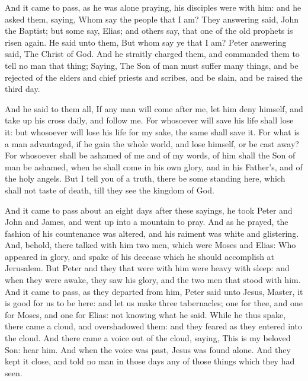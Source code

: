  And it came to pass, as he was alone praying, his
disciples were with him: and he asked them, saying, Whom say the people
that I am?  They answering said, John the Baptist; but some
say, Elias; and others say, that one of the old prophets is risen again.
 He said unto them, But whom say ye that I am? Peter
answering said, The Christ of God.  And he straitly charged
them, and commanded them to tell no man that thing; 
Saying, The Son of man must suffer many things, and be rejected of the
elders and chief priests and scribes, and be slain, and be raised the
third day.

 And he said to them all, If any man will come after me,
let him deny himself, and take up his cross daily, and follow me.
 For whosoever will save his life shall lose it: but
whosoever will lose his life for my sake, the same shall save it.
 For what is a man advantaged, if he gain the whole world,
and lose himself, or be cast away?  For whosoever shall be
ashamed of me and of my words, of him shall the Son of man be ashamed,
when he shall come in his own glory, and in his Father's, and of the
holy angels.  But I tell you of a truth, there be some
standing here, which shall not taste of death, till they see the kingdom
of God.

 And it came to pass about an eight days after these
sayings, he took Peter and John and James, and went up into a mountain
to pray.  And as he prayed, the fashion of his countenance
was altered, and his raiment was white and glistering. 
And, behold, there talked with him two men, which were Moses and Elias:
 Who appeared in glory, and spake of his decease which he
should accomplish at Jerusalem.  But Peter and they that
were with him were heavy with sleep: and when they were awake, they saw
his glory, and the two men that stood with him.  And it
came to pass, as they departed from him, Peter said unto Jesus, Master,
it is good for us to be here: and let us make three tabernacles; one for
thee, and one for Moses, and one for Elias: not knowing what he said.
 While he thus spake, there came a cloud, and overshadowed
them: and they feared as they entered into the cloud.  And
there came a voice out of the cloud, saying, This is my beloved Son:
hear him.  And when the voice was past, Jesus was found
alone. And they kept it close, and told no man in those days any of
those things which they had seen.

